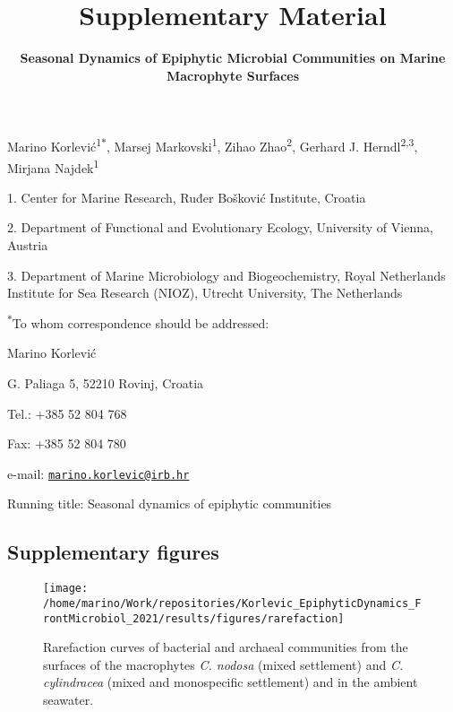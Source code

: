 \documentclass[
  12pt,
]{article}
\title{\textbf{Supplementary Material}}
\subtitle{\textbf{Seasonal Dynamics of Epiphytic Microbial Communities
on Marine Macrophyte Surfaces}}
\author{}
\date{\vspace{-2.5em}}
\begin{document}
\maketitle

\vspace{10mm}

Marino Korlević\textsuperscript{1\(*\)}, Marsej
Markovski\textsuperscript{1}, Zihao Zhao\textsuperscript{2}, Gerhard J.
Herndl\textsuperscript{2,3}, Mirjana Najdek\textsuperscript{1}

1. Center for Marine Research, Ruđer Bošković Institute, Croatia

2. Department of Functional and Evolutionary Ecology, University of
Vienna, Austria

3. Department of Marine Microbiology and Biogeochemistry, Royal
Netherlands Institute for Sea Research (NIOZ), Utrecht University, The
Netherlands

\textsuperscript{\(*\)}To whom correspondence should be addressed:

Marino Korlević

G. Paliaga 5, 52210 Rovinj, Croatia

Tel.: +385 52 804 768

Fax: +385 52 804 780

e-mail:
\href{mailto:marino.korlevic@irb.hr}{\nolinkurl{marino.korlevic@irb.hr}}

Running title: Seasonal dynamics of epiphytic communities

\setlength\parindent{24pt}

\hypertarget{supplementary-figures}{%
\subsection{Supplementary figures}\label{supplementary-figures}}

\begin{figure}[H]

{\centering \texttt{[image: /home/marino/Work/repositories/Korlevic\_EpiphyticDynamics\_FrontMicrobiol\_2021/results/figures/rarefaction]} 

}

\caption{Rarefaction curves of bacterial and archaeal communities from the surfaces of the macrophytes \textit{C. nodosa} (mixed settlement) and \textit{C. cylindracea} (mixed and monospecific settlement) and in the ambient seawater.\label{rarefaction}}\label{fig:unnamed-chunk-1}
\end{figure}
\end{document}

